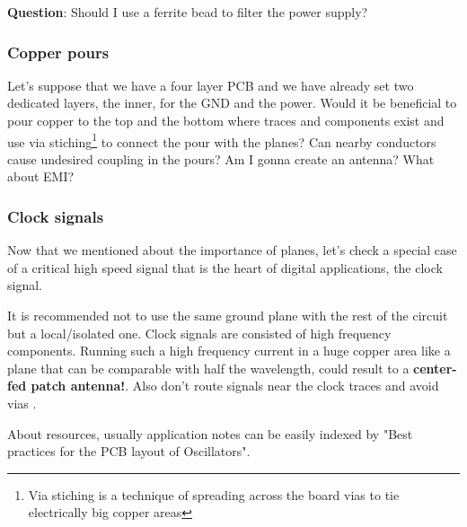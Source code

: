 \documentclass[final]{cubedoc}
\begin{document}
	\textbf{Question}: Should I use a ferrite bead to filter the power supply?
	
	\subsubsection{Copper pours}
	
	Let's suppose that we have a four layer PCB and we have already set two dedicated layers, the inner, for the GND and the power. Would it be beneficial to pour copper to the top and the bottom where traces and components exist and use via stiching\footnote{Via stiching is a technique of spreading across the board vias to tie electrically big copper areas} to connect the pour with the planes? Can nearby conductors cause undesired coupling in the pours? Am I gonna create an antenna? What about EMI?
	
	\subsubsection{Clock signals}
	
	Now that we mentioned about the importance of planes, let's check a special case of a critical high speed signal that is the heart of digital applications, the clock signal.
	
	It is recommended not to use the same ground plane with the rest of the circuit but a local/isolated one. Clock signals are consisted of high frequency components. Running such a high frequency current in a huge copper area like a plane that can be comparable with half the wavelength, could result to a \textbf{center-fed patch antenna!}. Also don't route signals near the clock traces and avoid vias \cite{stackexchange:decoupling, stackexchange:crystal, atmel:clock}.
	
	About resources, usually application notes can be easily indexed by "Best practices for the PCB layout of Oscillators".
	
	
	
	
\end{document}
